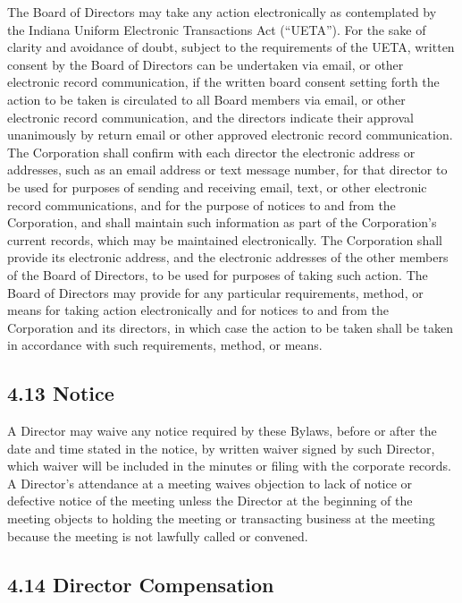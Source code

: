 \documentclass[
]{book}
\begin{document}
The Board of Directors may take any action electronically as contemplated by the Indiana Uniform Electronic Transactions Act (``UETA''). For the sake of clarity and avoidance of doubt, subject to the requirements of the UETA, written consent by the Board of Directors can be undertaken via email, or other electronic record communication, if the written board consent setting forth the action to be taken is circulated to all Board members via email, or other electronic record communication, and the directors indicate their approval unanimously by return email or other approved electronic record communication. The Corporation shall confirm with each director the electronic address or addresses, such as an email address or text message number, for that director to be used for purposes of sending and receiving email, text, or other electronic record communications, and for the purpose of notices to and from the Corporation, and shall maintain such information as part of the Corporation's current records, which may be maintained electronically. The Corporation shall provide its electronic address, and the electronic addresses of the other members of the Board of Directors, to be used for purposes of taking such action. The Board of Directors may provide for any particular requirements, method, or means for taking action electronically and for notices to and from the Corporation and its directors, in which case the action to be taken shall be taken in accordance with such requirements, method, or means.

\subsection{4.13 Notice}\label{notice}

A Director may waive any notice required by these Bylaws, before or after the date and time stated in the notice, by written waiver signed by such Director, which waiver will be included in the minutes or filing with the corporate records. A Director's attendance at a meeting waives objection to lack of notice or defective notice of the meeting unless the Director at the beginning of the meeting objects to holding the meeting or transacting business at the meeting because the meeting is not lawfully called or convened.

\subsection{4.14 Director Compensation}\label{director-compensation}
\end{document}
